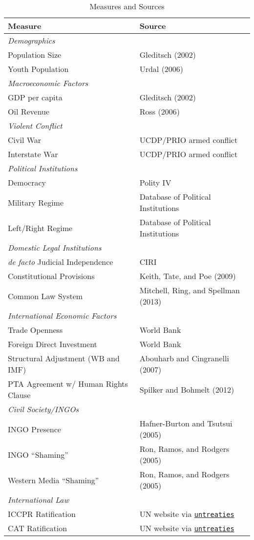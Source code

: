 \documentclass[12pt]{article}
\begin{document}
\begin{table}[htbp!] 
\caption{Measures and Sources} \label{vars}
\centering
\begin{tabular}{ll}
Measure & Source \\
\toprule
{\em Demographics} & \\
Population Size & Gleditsch (2002) \\
Youth Population & Urdal (2006) \\ 
\midrule
{\em Macroeconomic Factors} & \\
GDP per capita & Gleditsch (2002) \\
Oil Revenue & Ross (2006) \\ 
\midrule
{\em Violent Conflict} & \\
Civil War & UCDP/PRIO armed conflict \\
Interstate War & UCDP/PRIO armed conflict \\
\midrule
{\em Political Institutions} & \\
Democracy & Polity IV\\
Military Regime & Database of Political Institutions \\
Left/Right Regime & Database of Political Institutions  \\
\midrule
{\em Domestic Legal Institutions} & \\
{\em de facto} Judicial Independence & CIRI \\
Constitutional Provisions & Keith, Tate, and Poe (2009) \\
Common Law System & Mitchell, Ring, and Spellman (2013) \\
\midrule
{\em International Economic Factors} & \\
Trade Openness & World Bank \\
Foreign Direct Investment & World Bank \\
Structural Adjustment (WB and IMF) & Abouharb and Cingranelli (2007) \\
PTA Agreement w/ Human Rights Clause & Spilker and Bohmelt (2012) \\
\midrule
{\em Civil Society/INGOs} & \\
INGO Presence & Hafner-Burton and Tsutsui (2005) \\
INGO ``Shaming'' & Ron, Ramos, and Rodgers (2005)  \\
Western Media ``Shaming'' & Ron, Ramos, and Rodgers (2005) \\
\midrule
{\em International Law} & \\
ICCPR Ratification & UN website via {\tt \href{http://github.com/zmjones/untreaties}{untreaties}} \\
CAT Ratification & UN website via {\tt \href{http://github.com/zmjones/untreaties}{untreaties}} \\
\bottomrule
\end{tabular}
\end{table}
\end{document}
